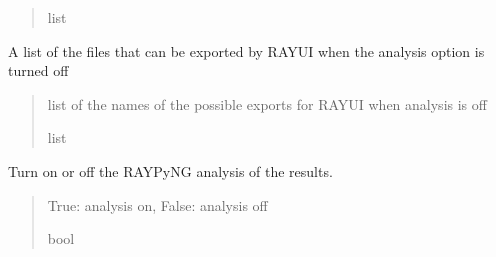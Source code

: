 \documentclass[letterpaper,10pt,english]{sphinxmanual}
\begin{document}
\begin{fulllineitems}
\begin{fulllineitems}
\begin{quote}
\begin{description}
\sphinxAtStartPar
list

\end{description}\end{quote}

\end{fulllineitems}


\begin{fulllineitems}
\label{\detokenize{index:raypyng.simulate.Simulate.possible_exports_without_analysis}}
\pysigstartsignatures
{}
\pysigstopsignatures
\sphinxAtStartPar
A list of the files that can be exported by RAY\sphinxhyphen{}UI when the
analysis option is turned off
\begin{quote}\begin{description}
\sphinxAtStartPar
list of the names of the possible exports for RAY\sphinxhyphen{}UI when analysis is off

\sphinxAtStartPar
list

\end{description}\end{quote}

\end{fulllineitems}


\begin{fulllineitems}
\label{\detokenize{index:raypyng.simulate.Simulate.raypyng_analysis}}
\pysigstartsignatures
{}
\pysigstopsignatures
\sphinxAtStartPar
Turn on or off the RAYPyNG analysis of the results.
\begin{quote}\begin{description}
\sphinxAtStartPar
True: analysis on, False: analysis off

\sphinxAtStartPar
bool

\end{description}\end{quote}


\end{fulllineitems}
\end{fulllineitems}
\end{document}
